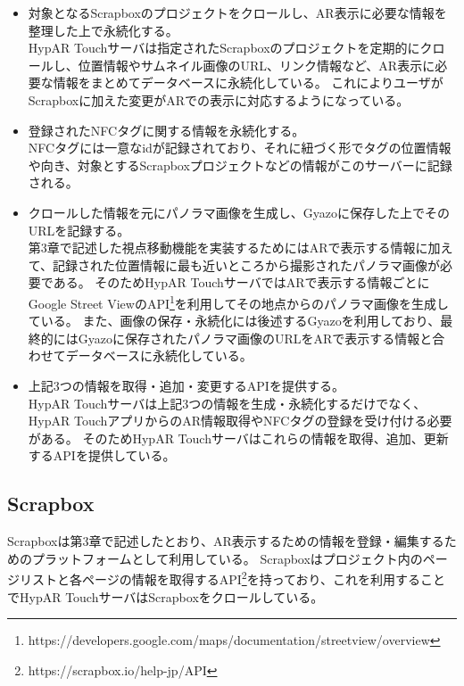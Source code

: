 \begin{itemize}
  \item 対象となるScrapboxのプロジェクトをクロールし、AR表示に必要な情報を整理した上で永続化する。\\
  HypAR Touchサーバは指定されたScrapboxのプロジェクトを定期的にクロールし、位置情報やサムネイル画像のURL、リンク情報など、AR表示に必要な情報をまとめてデータベースに永続化している。
  これによりユーザがScrapboxに加えた変更がARでの表示に対応するようになっている。
  \\
  \item 登録されたNFCタグに関する情報を永続化する。\\
  NFCタグには一意なidが記録されており、それに紐づく形でタグの位置情報や向き、対象とするScrapboxプロジェクトなどの情報がこのサーバーに記録される。
  \\
  \item クロールした情報を元にパノラマ画像を生成し、Gyazoに保存した上でそのURLを記録する。\\
  第3章で記述した視点移動機能を実装するためにはARで表示する情報に加えて、記録された位置情報に最も近いところから撮影されたパノラマ画像が必要である。
  そのためHypAR TouchサーバではARで表示する情報ごとにGoogle Street ViewのAPI\footnote{\textsf{https://developers.google.com/maps/documentation/streetview/overview}}を利用してその地点からのパノラマ画像を生成している。
  また、画像の保存・永続化には後述するGyazoを利用しており、最終的にはGyazoに保存されたパノラマ画像のURLをARで表示する情報と合わせてデータベースに永続化している。
  \\
  \item 上記3つの情報を取得・追加・変更するAPIを提供する。\\
  HypAR Touchサーバは上記3つの情報を生成・永続化するだけでなく、HypAR TouchアプリからのAR情報取得やNFCタグの登録を受け付ける必要がある。
  そのためHypAR Touchサーバはこれらの情報を取得、追加、更新するAPIを提供している。

\end{itemize}

\subsection{Scrapbox}
Scrapboxは第3章で記述したとおり、AR表示するための情報を登録・編集するためのプラットフォームとして利用している。
Scrapboxはプロジェクト内のページリストと各ページの情報を取得するAPI\footnote{\textsf{https://scrapbox.io/help-jp/API}}を持っており、これを利用することでHypAR TouchサーバはScrapboxをクロールしている。

